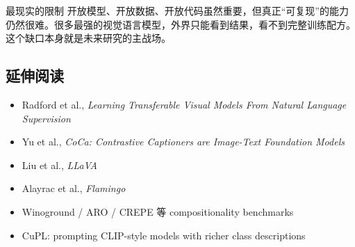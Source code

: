\documentclass[a4paper]{article}
\begin{document}
\begin{warningbox}{最现实的限制}
开放模型、开放数据、开放代码虽然重要，但真正“可复现”的能力仍然很难。很多最强的视觉语言模型，外界只能看到结果，看不到完整训练配方。这个缺口本身就是未来研究的主战场。
\end{warningbox}

\subsection{延伸阅读}

\begin{itemize}
    \item Radford et al., \emph{Learning Transferable Visual Models From Natural Language Supervision}
    \item Yu et al., \emph{CoCa: Contrastive Captioners are Image-Text Foundation Models}
    \item Liu et al., \emph{LLaVA}
    \item Alayrac et al., \emph{Flamingo}
    \item Winoground / ARO / CREPE 等 compositionality benchmarks
    \item CuPL: prompting CLIP-style models with richer class descriptions
\end{itemize}
\end{document}
